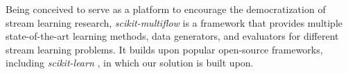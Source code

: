 Being conceived to serve as a platform to encourage the democratization of stream learning research, \textit{scikit-multiflow} \citep{montiel2018} is a framework that provides multiple state-of-the-art learning methods, data generators, and evaluators for different stream learning problems. It builds upon popular open-source frameworks, including \textit{scikit-learn} \citep{pedregosa2011}, in which our solution is built upon.